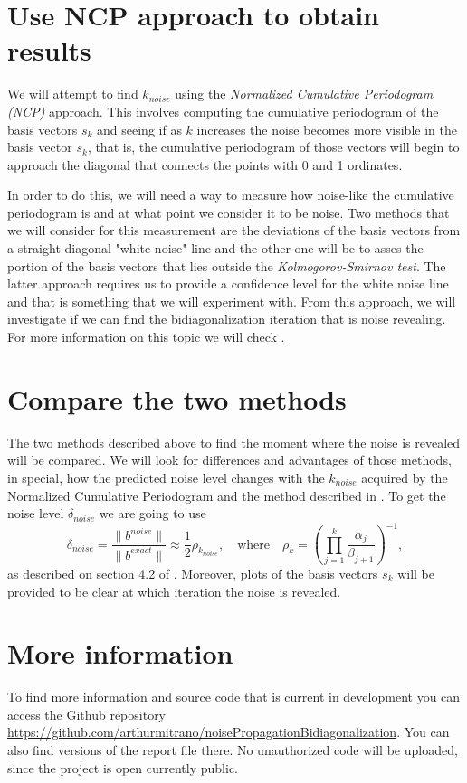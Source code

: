 \documentclass[11pt]{amsart}
\begin{document}
\section{Use NCP approach to obtain results}
We will attempt to find $k_{noise}$ using the \emph{Normalized Cumulative Periodogram (NCP)} approach.
This involves computing the cumulative periodogram of the basis vectors $s_k$ and seeing if as $k$ 
increases the noise becomes more visible in the basis vector $s_k$, that is, the cumulative periodogram
of those vectors will begin to approach the diagonal that connects the points with 0 and 1 ordinates.
 
In order to do this, we will need a way to measure how noise-like the cumulative periodogram is and at
what point we consider it to be noise. Two methods that we will consider for this measurement are the
deviations of the basis vectors from a straight diagonal "white noise" line and the other one will be
to asses the portion of the basis vectors that lies outside the \emph{Kolmogorov-Smirnov test}. 
The latter approach requires us to provide a confidence level for the white noise line and that is
something that we will experiment with. From this approach, we will investigate if we can find the
bidiagonalization iteration that is noise revealing. For more information on this topic we will check
\cite{peridograms}.


\section{Compare the two methods}
The two methods described above to find the moment where the noise is revealed will be compared. We will look
for differences and advantages of those methods, in special, how the predicted noise level changes with the 
$k_{noise}$ acquired by the Normalized Cumulative Periodogram and the method described in \cite{bidiagonalization}.
To get the noise level $\delta_{noise}$ we are going to use 
\begin{equation*}
	\delta_{noise} = \frac{\|b^{noise}\|}{\|b^{exact}\|} \approx \frac{1}{2}\rho_{k_{noise}}, \quad \text{where}
	\quad \rho_{k} = \left(\prod_{j=1}^k\frac{\alpha_j}{\beta_{j+1}}\right)^{-1},
\end{equation*}
as described on section 4.2 of \cite{bidiagonalization}.
Moreover, plots of the basis vectors $s_k$ will be provided to be clear at which iteration the noise is
revealed.

\section{More information}
\begin{sloppypar}
To find more information and source code that is current in development you can access the Github repository
\url{https://github.com/arthurmitrano/noisePropagationBidiagonalization}. You can also find 
versions of the report file there. No unauthorized code will be uploaded, since the project is open currently
public.
\end{sloppypar}
\end{document}
